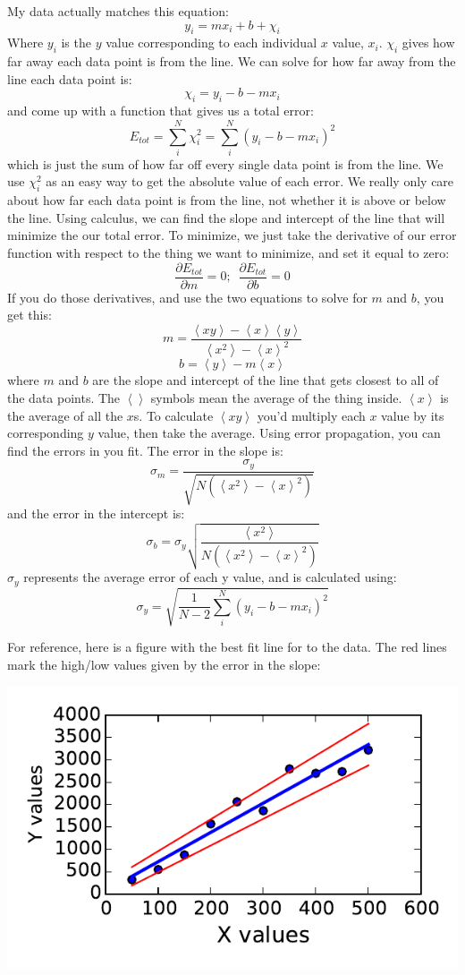 \documentclass[twoside,11pt,ShortChapTitles]{BYUTextbook}
\begin{document}
My data actually matches this equation:
\[y_i=mx_i+b+\chi_i\]
Where $y_i$ is the $y$ value corresponding to each individual $x$ value, $x_i$.  $\chi_i$ gives how far away each data point is from the line. We can solve for how far away from the line each data point is:
\[\chi_i=y_i-b-mx_i\]
and come up with a function that gives us a total error:
\[E_{tot}=\sum_i^N \chi_i^2 = \sum_i^N (y_i-b-mx_i)^2\]
which is just the sum of how far off every single data point is from the line.  We use $\chi_i^2$ as an easy way to get the absolute value of each error.  We really only care about how far each data point is from the line, not whether it is above or below the line.  Using calculus, we can find the slope and intercept of the line that will minimize the our total error.  To minimize, we just take the derivative of our error function with respect to the thing we want to minimize, and set it equal to zero:
\[\frac{\partial E_{tot}}{\partial m}=0;\,\,\,\frac{\partial E_{tot}}{\partial b}=0\]
If you do those derivatives, and use the two equations to solve for $m$ and $b$, you get this:
\[m=\frac{\left<xy\right>-\left<x\right>\left<y\right>}{\left<x^2\right>-\left<x\right>^2}\]
\[b=\left<y\right>-m\left<x\right>\]
where $m$ and $b$ are the slope and intercept of the line that gets closest to all of the data points.  The $\left<\right>$ symbols mean the average of the thing inside. $\left<x\right>$ is the average of all the $x$s.  To calculate $\left<xy\right>$ you'd multiply each $x$ value by its corresponding $y$ value, then take the average.
Using error propagation, you can find the errors in you fit.  The error in the slope is:
\[\sigma_m=\frac{\sigma_y}{\sqrt{N\left(\left<x^2\right>-\left<x\right>^2\right)}}\]
and the error in the intercept is:
\[\sigma_b=\sigma_y\sqrt{\frac{\left<x^2\right>}{N\left(\left<x^2\right>-\left<x\right>^2\right)}}\]
$\sigma_y$ represents the average error of each y value, and is calculated using:
\[\sigma_y=\sqrt{\frac{1}{N-2}\sum_i^N \left(y_i-b-mx_i\right)^2}\]

For reference, here is a figure with the best fit line for to the data.  The red lines mark the high/low values given by the error in the slope:
\begin{center}
\includegraphics{Lab4_figs/dataWfitRange.pdf}
\end{center}
\end{document}
